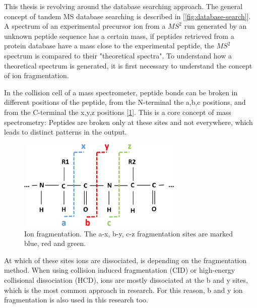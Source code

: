 \documentclass[11pt]{article}
\begin{document}
This thesis is revolving around the database searching approach. The general concept of tandem MS database searching is described in [\cref{fig:database-search}]. A spectrum of an experimental precursor ion from a \(MS^2\) run generated by an unknown peptide sequence has a certain mass, if peptides retrieved from a protein database have a mass close to the experimental peptide, the \(MS^2\) spectrum is compared to their "theoretical spectra". To understand how a theoretical spectrum is generated, it is first necessary to understand the concept of ion fragmentation. 

In the collision cell of a mass spectrometer, peptide bonds can be broken in different positions of the peptide, from the N-terminal the a,b,c positions, and from the C-terminal the x,y,z positions [\cref{fig:ion-frag}]. This is a core concept of mass spectrometry: Peptides are broken only at these sites and not everywhere, which leads to distinct patterns in the output.
\begin{figure}[ht]
\centering
\includegraphics[width=0.7\textwidth]{figs/ion-frag.png}
\caption{Ion fragmentation. The a-x, b-y, c-z fragmentation sites are marked blue, red and green. \cite{ion-frag}}
\label{fig:ion-frag}
\end{figure}
At which of these sites ions are dissociated, is depending on the fragmentation method. When using collision induced fragmentation (CID) or high-energy collisional dissociation (HCD), ions are mostly dissociated at the b and y sites, which is the most common approach in research. For this reason, b and y ion fragmentation is also used in this research too. 
\end{document}
